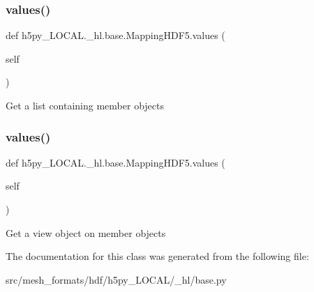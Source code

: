 \subsubsection{\texorpdfstring{values()}{values()}\hspace{0.1cm}{\footnotesize\ttfamily [1/2]}}
{\footnotesize\ttfamily def h5py\+\_\+\+L\+O\+C\+A\+L.\+\_\+hl.\+base.\+Mapping\+H\+D\+F5.\+values (\begin{DoxyParamCaption}\item[{}]{self }\end{DoxyParamCaption})}

\begin{DoxyVerb}Get a list containing member objects \end{DoxyVerb}
 \mbox{\label{classh5py__LOCAL_1_1__hl_1_1base_1_1MappingHDF5_a5c11f8f96e81115ba7d571d116306251}} 
\subsubsection{\texorpdfstring{values()}{values()}\hspace{0.1cm}{\footnotesize\ttfamily [2/2]}}
{\footnotesize\ttfamily def h5py\+\_\+\+L\+O\+C\+A\+L.\+\_\+hl.\+base.\+Mapping\+H\+D\+F5.\+values (\begin{DoxyParamCaption}\item[{}]{self }\end{DoxyParamCaption})}

\begin{DoxyVerb}Get a view object on member objects \end{DoxyVerb}
 

The documentation for this class was generated from the following file\+:\begin{DoxyCompactItemize}
\item 
src/mesh\+\_\+formats/hdf/h5py\+\_\+\+L\+O\+C\+A\+L/\+\_\+hl/base.\+py\end{DoxyCompactItemize}
